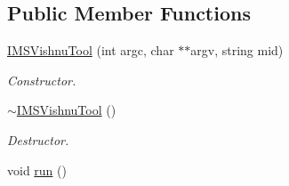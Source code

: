 \subsection*{Public Member Functions}
\begin{DoxyCompactItemize}
\item 
\hyperlink{classIMSVishnuTool_aae3ba24f147f2274ec491c6650a57056}{IMSVishnuTool} (int argc, char $\ast$$\ast$argv, string mid)
\begin{DoxyCompactList}\small\item\em Constructor. \item\end{DoxyCompactList}\item 
\hypertarget{classIMSVishnuTool_ae6320330f72c8565464c07cb729425f1}{
\hyperlink{classIMSVishnuTool_ae6320330f72c8565464c07cb729425f1}{$\sim$IMSVishnuTool} ()}
\label{classIMSVishnuTool_ae6320330f72c8565464c07cb729425f1}

\begin{DoxyCompactList}\small\item\em Destructor. \item\end{DoxyCompactList}\item 
\hypertarget{classIMSVishnuTool_a422196c764e2df39da35e43be857a379}{
void \hyperlink{classIMSVishnuTool_a422196c764e2df39da35e43be857a379}{run} ()}
\label{classIMSVishnuTool_a422196c764e2df39da35e43be857a379}


\end{DoxyCompactItemize}
